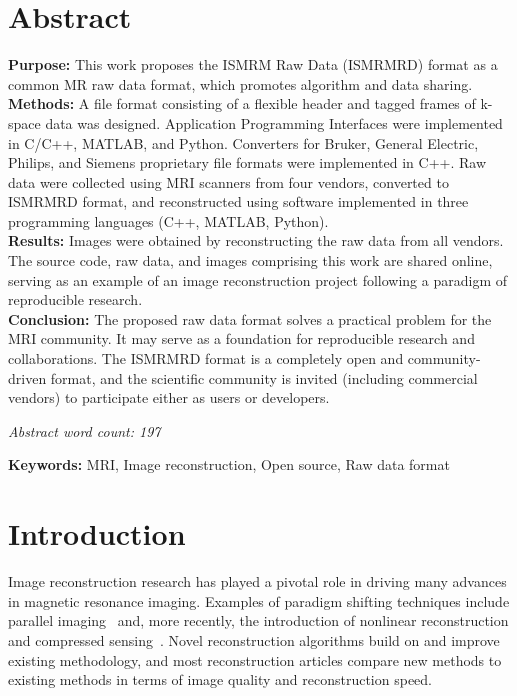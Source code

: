 \documentclass[12pt, draft]{article}
\begin{document}
\section*{Abstract}
\textbf{Purpose:}  This work proposes the ISMRM Raw Data (ISMRMRD) format as a common MR raw data format, which promotes algorithm and data sharing.\\
\textbf{Methods:} A file format consisting of a flexible header and tagged frames of k-space data was designed. Application Programming Interfaces were implemented in C/C++, MATLAB, and Python. Converters for Bruker, General Electric, Philips, and Siemens proprietary file formats were implemented in C++. Raw data were collected using MRI scanners from four vendors, converted to ISMRMRD format, and reconstructed using software implemented in three programming languages (C++, MATLAB, Python).\\
\textbf{Results:} Images were obtained by reconstructing the raw data from all vendors. The source code, raw data, and images comprising this work are shared online, serving as an example of an image reconstruction project following a paradigm of reproducible research.\\
\textbf{Conclusion:} The proposed raw data format solves a practical problem for the MRI community.  It may serve as a foundation for reproducible research and collaborations.  The ISMRMRD format is a completely open and community-driven format, and the scientific community is invited (including commercial vendors) to participate either as users or developers.

\textit{Abstract word count: 197} %

\textbf{Keywords:}  MRI, Image reconstruction, Open source, Raw data format

\newpage
\clearpage
\onecolumn

\section*{Introduction}
Image reconstruction research has played a pivotal role in driving many advances in magnetic resonance imaging. Examples of paradigm shifting techniques include parallel imaging~\cite{Pruessmann:1999uq, Sodickson:1997fk, Griswold:2002kx}  and, more recently, the introduction of nonlinear reconstruction and compressed sensing~\cite{Donoho:2006compressed, Lustig:2007vn}. Novel reconstruction algorithms build on and improve existing methodology, and most reconstruction articles compare new methods to existing methods in terms of image quality and reconstruction speed.
\end{document}
